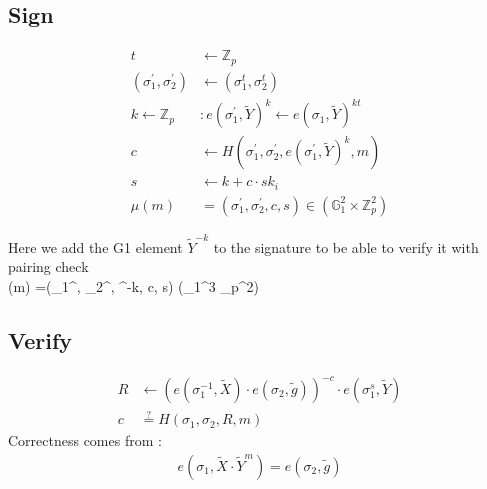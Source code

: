 \documentclass[11pt]{article}
\newenvironment{optimization}{\par\color{blue}}{\par}
\begin{document}
    \subsection{Sign}
    \begin{align}
        t &\leftarrow \mathbb{Z}_p\\
        (\sigma_1^{\prime}, \sigma_2^{\prime})
        &\leftarrow (\sigma_1^t, \sigma_2^t)\\
        k \leftarrow \mathbb{Z}_p &: e(\sigma_1^{\prime}, \tilde{Y})^k \leftarrow e(\sigma_1, \tilde{Y})^{kt} \\
        c &\leftarrow H(\sigma_1^{\prime}, \sigma_2^{\prime}, e(\sigma_1^{\prime}, \tilde{Y})^{k}, m)\\
        s &\leftarrow k+ c \cdot sk_i \\
        \mu(m) &=(\sigma_1^{\prime}, \sigma_2^{\prime}, c, s) \in (\mathbb{G}_1^2 \times \mathbb{Z}_p^2)
    \end{align}
    \begin{optimization}
        Here we add the G1 element $\tilde{Y}^{-k}$ to the signature to be able to verify it with pairing check\\
        \mu(m) =(\sigma_1^{\prime}, \sigma_2^{\prime}, ^{-k}, c, s) \in (_1^3 \times {}_p^2)
    \end{optimization}

    \subsection{Verify}
    \begin{align}
        R &\leftarrow (e(\sigma_1^{-1}, \tilde{X})\cdot e(\sigma_2, \tilde{g}))^{-c}\cdot e(\sigma_1^s, \tilde{Y}) \label{eq:R}\\
        c & \stackrel{?}{=} H(\sigma_1, \sigma_2,R, m)
    \end{align}
    Correctness comes from :
    \begin{align}
        e(\sigma_1, \tilde{X}\cdot \tilde{Y}^m)=e(\sigma_2, \tilde{g})
    \end{align}
\end{document}
